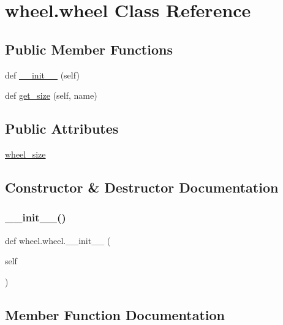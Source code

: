 \hypertarget{classwheel_1_1wheel}{}\section{wheel.\+wheel Class Reference}
\label{classwheel_1_1wheel}
\subsection*{Public Member Functions}
\begin{DoxyCompactItemize}
\item 
def \hyperlink{classwheel_1_1wheel_ad74f17bf918fd53ed5e62566ee367dab}{\+\_\+\+\_\+init\+\_\+\+\_\+} (self)
\item 
def \hyperlink{classwheel_1_1wheel_a2c8cb4fefde6714812f8d362b8744a63}{get\+\_\+size} (self, name)
\end{DoxyCompactItemize}
\subsection*{Public Attributes}
\begin{DoxyCompactItemize}
\item 
\hyperlink{classwheel_1_1wheel_ad2bdaadaaf22bc7522c6c579e9c2d6d8}{wheel\+\_\+size}
\end{DoxyCompactItemize}


\subsection{Constructor \& Destructor Documentation}
\mbox{\label{classwheel_1_1wheel_ad74f17bf918fd53ed5e62566ee367dab}} 
\subsubsection{\texorpdfstring{\+\_\+\+\_\+init\+\_\+\+\_\+()}{\_\_init\_\_()}}
{\footnotesize\ttfamily def wheel.\+wheel.\+\_\+\+\_\+init\+\_\+\+\_\+ (\begin{DoxyParamCaption}\item[{}]{self }\end{DoxyParamCaption})}



\subsection{Member Function Documentation}
\mbox{\label{classwheel_1_1wheel_a2c8cb4fefde6714812f8d362b8744a63}} 
